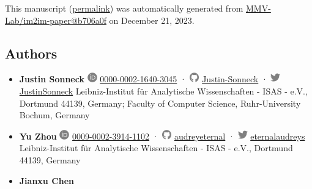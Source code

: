 This manuscript
(\href{https://MMV-Lab.github.io/im2im-paper/v/b706a0f2a0baec0ce0e9d53b323e30ffcf269306/}{permalink})
was automatically generated
from \href{https://github.com/MMV-Lab/im2im-paper/tree/b706a0f2a0baec0ce0e9d53b323e30ffcf269306}{MMV-Lab/im2im-paper@b706a0f}
on December 21, 2023.

\hypertarget{authors}{%
\subsection{Authors}\label{authors}}

\begin{itemize}
\item
  \textbf{Justin Sonneck}
  \includegraphics[width=0.16667in,height=0.16667in]{images/orcid.svg}
  \href{https://orcid.org/0000-0002-1640-3045}{0000-0002-1640-3045}
  · \includegraphics[width=0.16667in,height=0.16667in]{images/github.svg}
  \href{https://github.com/Justin-Sonneck}{Justin-Sonneck}
  · \includegraphics[width=0.16667in,height=0.16667in]{images/twitter.svg}
  \href{https://twitter.com/JustinSonneck}{JustinSonneck}
  Leibniz-Institut für Analytische Wissenschaften - ISAS - e.V., Dortmund 44139, Germany; Faculty of Computer Science, Ruhr-University Bochum, Germany
\item
  \textbf{Yu Zhou}
  \includegraphics[width=0.16667in,height=0.16667in]{images/orcid.svg}
  \href{https://orcid.org/0009-0002-3914-1102}{0009-0002-3914-1102}
  · \includegraphics[width=0.16667in,height=0.16667in]{images/github.svg}
  \href{https://github.com/audreyeternal}{audreyeternal}
  · \includegraphics[width=0.16667in,height=0.16667in]{images/twitter.svg}
  \href{https://twitter.com/eternalaudreys}{eternalaudreys}
  Leibniz-Institut für Analytische Wissenschaften - ISAS - e.V., Dortmund 44139, Germany
\item
  \textbf{Jianxu Chen}

\end{itemize}

